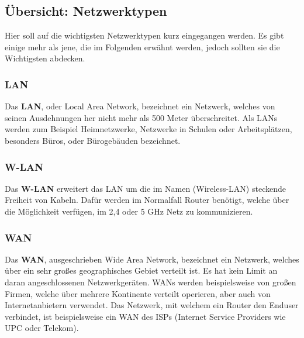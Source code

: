 \documentclass[12pt,a4paper]{report}
\begin{document}
\subsection{Übersicht: Netzwerktypen}
Hier soll auf die wichtigsten Netzwerktypen kurz eingegangen werden. Es gibt einige mehr als jene, die im Folgenden erwähnt werden, jedoch sollten sie die Wichtigsten abdecken.
\subsubsection{LAN}
Das \textbf{LAN}, oder Local Area Network, bezeichnet ein Netzwerk, welches von seinen Ausdehnungen her nicht mehr als 500 Meter überschreitet. Als LANs werden zum Beispiel Heimnetzwerke, Netzwerke in Schulen oder Arbeitsplätzen, besonders Büros, oder Bürogebäuden bezeichnet.
\subsubsection{W-LAN}
Das \textbf{W-LAN} erweitert das LAN um die im Namen (Wireless-LAN) steckende Freiheit von Kabeln. Dafür werden im Normalfall Router benötigt, welche über die Möglichkeit verfügen, im 2,4 oder 5 GHz Netz zu kommunizieren.
\subsubsection{WAN}
Das \textbf{WAN}, ausgeschrieben Wide Area Network, bezeichnet ein Netzwerk, welches über ein sehr großes geographisches Gebiet verteilt ist. Es hat kein Limit an daran angeschlossenen Netzwerkgeräten. WANs werden beispielsweise von großen Firmen, welche über mehrere Kontinente verteilt operieren, aber auch von Internetanbietern verwendet. Das Netzwerk, mit welchem ein Router den Enduser verbindet, ist beispielsweise ein WAN des ISPs (Internet Service Providers wie UPC oder Telekom). 
\end{document}
